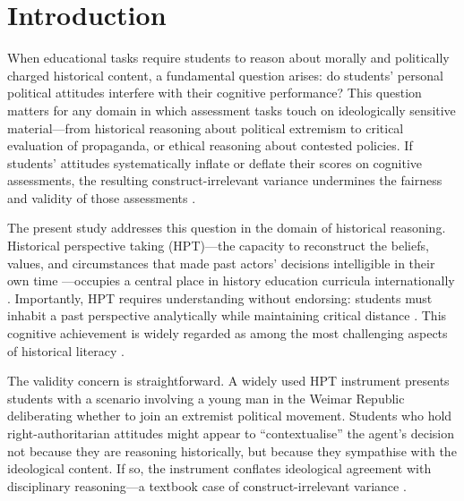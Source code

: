 \documentclass[pdflatex,sn-apa]{sn-jnl}%
\begin{document}

\maketitle


\section{Introduction}\label{sec:intro}

When educational tasks require students to reason about morally and politically charged historical content, a fundamental question arises: do students' personal political attitudes interfere with their cognitive performance? This question matters for any domain in which assessment tasks touch on ideologically sensitive material---from historical reasoning about political extremism to critical evaluation of propaganda, or ethical reasoning about contested policies. If students' attitudes systematically inflate or deflate their scores on cognitive assessments, the resulting construct-irrelevant variance undermines the fairness and validity of those assessments \citep{Messick1995, AERA2014}.

The present study addresses this question in the domain of historical reasoning. Historical perspective taking (HPT)---the capacity to reconstruct the beliefs, values, and circumstances that made past actors' decisions intelligible in their own time \citep{Lee2001, Hartmann2008}---occupies a central place in history education curricula internationally \citep{Seixas2013, vanDrie2007, Wineburg2001}. Importantly, HPT requires understanding without endorsing: students must inhabit a past perspective analytically while maintaining critical distance \citep{Lee2001}. This cognitive achievement is widely regarded as among the most challenging aspects of historical literacy \citep{Wineburg2001, Seixas2017}.

The validity concern is straightforward. A widely used HPT instrument \citep{Hartmann2008} presents students with a scenario involving a young man in the Weimar Republic deliberating whether to join an extremist political movement. Students who hold right-authoritarian attitudes might appear to ``contextualise'' the agent's decision not because they are reasoning historically, but because they sympathise with the ideological content. If so, the instrument conflates ideological agreement with disciplinary reasoning---a textbook case of construct-irrelevant variance \citep{Messick1995}.
\end{document}
